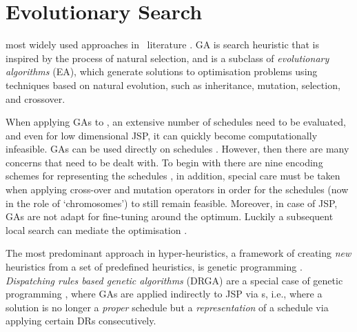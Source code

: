

\chapter{Evolutionary Search}\label{ch:esmodels} 

 most widely used 
approaches in \JSP\ literature \citep{Pinedo08}. 
GA is search heuristic that is inspired by the process of natural selection, 
and is a subclass of \emph{evolutionary algorithms} (EA), which generate 
solutions to optimisation problems using techniques based on natural evolution, 
such as inheritance, mutation, selection, and crossover.

When applying GAs to \JSP, an extensive number of schedules need to be 
evaluated, and even for low dimensional JSP, it can quickly become 
computationally infeasible. GAs can be used directly on schedules 
\citep{Cheng96,Cheng99,Tsai07,Qing-dao-er-ji12,Ak12}. 
However, then there are many concerns that need to be dealt with. 
To begin with there are nine encoding schemes for representing the schedules 
\citep{Cheng96}, in addition, special care must be taken when applying 
cross-over and mutation operators in order for the schedules (now in the role 
of `chromosomes') to still remain feasible. 
Moreover, in case of JSP, GAs are not adapt for fine-tuning around the optimum. 
Luckily a subsequent local search can mediate the optimisation 
\citep{Cheng99,Meeran12}.

The most predominant approach in hyper-heuristics, a framework of creating 
\emph{new} heuristics from a set of  predefined heuristics, is genetic 
programming \citep{Burke10}. 
\emph{Dispatching rules based genetic algorithms} (DRGA) 
\citep{Vazquez-Rodriguez09,Dhingra10,Nguyen13} are a special case of genetic 
programming \citep{Koza05}, where GAs are applied indirectly to JSP via 
\dr s, i.e., where a solution is no longer a \emph{proper} schedule 
but a \emph{representation} of a schedule via applying certain DRs 
consecutively. 

